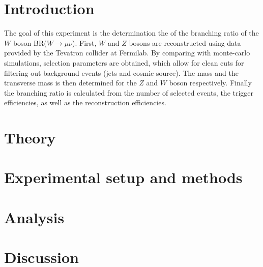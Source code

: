 \documentclass[twoside,        %
               BCOR12mm,       %
               ngerman,english, %
               fleqn,headsepline=false,footsepline=false
              ]{Vorlage/MFPREPORT}
\begin{document}
\date{\today}
\CopyNotWanted

\maketitle


\tableofcontents

\clearpage
{}

\section{Introduction}
\label{sec:introduction}
The goal of this experiment is the determination the  of the branching ratio of the $W$ boson
BR($W\rightarrow\mu\nu$). First, $W$ and $Z$ bosons are reconstructed using
data provided by the Tevatron collider at Fermilab. By comparing with monte-carlo
simulations, selection parameters are obtained, which allow for clean cuts for
filtering out background events (jets and cosmic source). The mass and the
transverse mass is then determined for the $Z$ and $W$ boson respectively.
Finally the branching ratio is calculated from the number of selected events,
the trigger efficiencies, as well as the reconstruction efficiencies.


\section{Theory}
\label{sec:theory}

\section{Experimental setup and methods}
\label{sec:setup}

\section{Analysis}
\label{sec:analysis}

\section{Discussion}
\label{sec:discussion}
\end{document}
